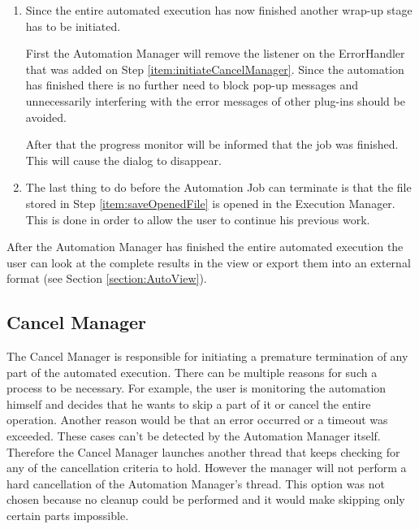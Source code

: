 \begin{enumerate}
 \item \label{item:automationDone} Since the entire automated execution has now finished another wrap-up
stage has to be initiated. 

First the Automation Manager will remove the listener on the ErrorHandler that was added on Step
\ref{item:initiateCancelManager}. Since the automation has finished there is no further need to block
pop-up messages and unnecessarily interfering with the error messages of other plug-ins should be
avoided.

After that the progress monitor will be informed that the job was finished. This will cause the 
dialog to disappear.

 \item \label{item:restoreFile} The last thing to do before the Automation Job can terminate is
that the file stored in Step \ref{item:saveOpenedFile} is opened in the Execution Manager. This is
done in order to allow the user to continue his previous work.
\end{enumerate}

After the Automation Manager has finished the entire automated execution the user can look at
the complete results in the view or export them into an external format (see Section \ref{section:AutoView}).

\subsection{Cancel Manager}
\label{section:CancelManager}
The Cancel Manager is responsible for initiating a premature termination of any part of
the automated execution. There can be multiple reasons for such a process to be necessary.
For example, the user is monitoring the automation himself and decides that he wants to
skip a part of it or cancel the entire operation. Another reason would be that an error
occurred or a timeout was exceeded. These cases can't be detected by the
Automation Manager itself. Therefore the Cancel Manager launches another thread that
keeps checking for any of the cancellation criteria to hold. However the manager will
not perform a hard cancellation of the Automation Manager's thread. This option was not
chosen because no cleanup could be performed and it would make skipping only certain parts impossible.


